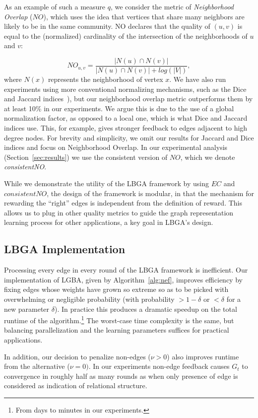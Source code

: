 \documentclass[twoside,twocolumn]{article}
\begin{document}
As an example of such a measure $q$, we consider the metric of
\emph{Neighborhood Overlap} ($NO$), which uses the idea that vertices that
share many neighbors are likely to be in the same community. NO
declares that the quality of $(u,v)$ is equal to the (normalized)
cardinality of the intersection of the neighborhoods of $u$ and $v$: 

\[ 
   NO_{u,v}=\frac{|N(u) \cap N(v)|}{|N(u) \cap N(v)| + log(|V|)}, 
\] 
where $N(x)$ represents the neighborhood of vertex $x$. We have also run
experiments using more conventional normalizing mechanisms, such as the Dice
and Jaccard indices~\cite{Dice1945,Jaccard1912}), but our neighborhood overlap
metric outperforms them by at least 10\% in our experiments. We argue this is
due to the use of a global normalization factor, as opposed to a local one,
which is what Dice and Jaccard indices use. This, for example, gives stronger
feedback to edges adjacent to high degree nodes. For brevity and simplicity, we
omit our results for Jaccard and Dice indices and focus on Neighborhood
Overlap. In our experimental analysis (Section~\ref{sec:results}) we use the
consistent version of $NO$, which we denote \emph{consistentNO}. 

While we demonstrate the utility of the LBGA framework by using $EC$ and
$consistentNO$, the design of the framework is modular, in that the mechanism
for rewarding the ``right'' edges is independent from the definition of reward.
This allows us to plug in other quality metrics to guide the graph
representation learning process for other applications, a key goal in LBGA's
design.


\subsection{LBGA Implementation} 
Processing every edge in every round of the LBGA framework is inefficient.
Our implementation of LGBA, given by Algorithm~\ref{alg:nef}, improves
efficiency by fixing edges whose weights have grown so extreme so as to be
picked with overwhelming or negligible probability (with probability $ >
1-\delta$ or $< \delta$ for a new parameter $\delta$). In practice this
produces a dramatic speedup on the total runtime of the
algorithm.\footnote{From days to minutes in our experiments.} The worst-case
time complexity is the same, but balancing parallelization and the learning
parameters suffices for practical applications. 

In addition, our decision to penalize non-edges ($\nu > 0$) also improves
runtime from the alternative ($\nu = 0)$. In our experiments non-edge feedback
causes $G_t$ to convergence in roughly half as many rounds as when only
presence of edge is considered as indication of relational structure.
\end{document}
